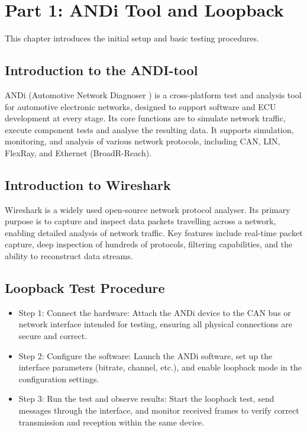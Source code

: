 \section{Part 1: ANDi Tool and Loopback}
\label{sec:andi-tool}

This chapter introduces the initial setup and basic testing procedures.

\subsection{Introduction to the ANDI-tool}
ANDi (Automotive Network Diagnoser ) is a cross-platform test and analysis tool for automotive electronic networks, designed to support software and ECU development at every stage. Its core functions are to simulate network traffic, execute component tests and analyse the resulting data\cite{technica}. It supports simulation, monitoring, and analysis of various network protocols, including CAN, LIN, FlexRay, and Ethernet (BroadR-Reach).
   
\subsection{Introduction to Wireshark}
Wireshark is a widely used open-source network protocol analyser. Its primary purpose is to capture and inspect data packets travelling across a network, enabling detailed analysis of network traffic. Key features include real-time packet capture, deep inspection of hundreds of protocols, filtering capabilities, and the ability to reconstruct data streams. 
   
\subsection{Loopback Test Procedure}
\begin{itemize}
    \item Step 1: Connect the hardware: Attach the ANDi device to the CAN bus or network interface intended for testing, ensuring all physical connections are secure and correct. 
    \item Step 2: Configure the software: Launch the ANDi software, set up the interface parameters (bitrate, channel, etc.), and enable loopback mode in the configuration settings. 
    \item Step 3: Run the test and observe results: Start the loopback test, send messages through the interface, and monitor received frames to verify correct transmission and reception within the same device. 
\end{itemize}

